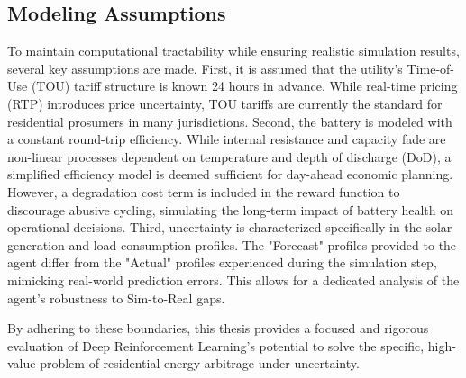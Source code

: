 \subsection{Modeling Assumptions}
To maintain computational tractability while ensuring realistic simulation results, several key assumptions are made. First, it is assumed that the utility's Time-of-Use (TOU) tariff structure is known 24 hours in advance. While real-time pricing (RTP) introduces price uncertainty, TOU tariffs are currently the standard for residential prosumers in many jurisdictions. Second, the battery is modeled with a constant round-trip efficiency. While internal resistance and capacity fade are non-linear processes dependent on temperature and depth of discharge (DoD), a simplified efficiency model is deemed sufficient for day-ahead economic planning. However, a degradation cost term is included in the reward function to discourage abusive cycling, simulating the long-term impact of battery health on operational decisions. Third, uncertainty is characterized specifically in the solar generation and load consumption profiles. The "Forecast" profiles provided to the agent differ from the "Actual" profiles experienced during the simulation step, mimicking real-world prediction errors. This allows for a dedicated analysis of the agent's robustness to Sim-to-Real gaps.

By adhering to these boundaries, this thesis provides a focused and rigorous evaluation of Deep Reinforcement Learning's potential to solve the specific, high-value problem of residential energy arbitrage under uncertainty.
